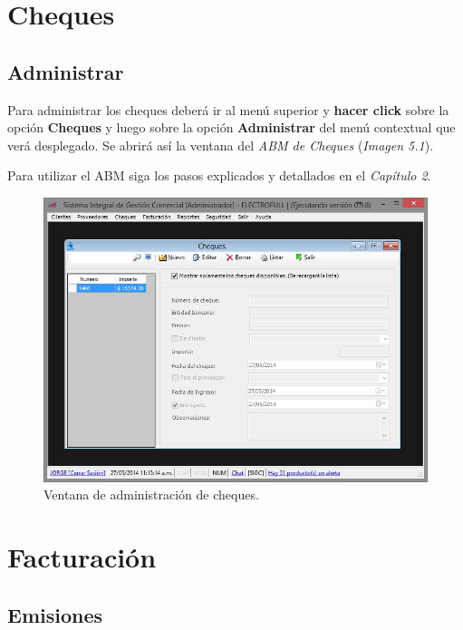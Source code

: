 \documentclass{book}
\begin{document}
%
%
\chapter{Cheques}


\section{Administrar}

Para administrar los cheques deberá ir al menú superior y \textbf{hacer click} sobre la opción \textbf{Cheques} y luego sobre la opción \textbf{Administrar} del menú contextual que verá desplegado. Se abrirá así la ventana del \textit{ABM de Cheques} (\textit{Imagen 5.1}). 
\par
Para utilizar el ABM siga los pasos explicados y detallados en el \textit{Capítulo 2}. 
\bigskip

\begin{figure}[H]
	\centering
	\includegraphics[width=1.0\textwidth]{images/ventanas/ventana-08.jpg}
	\caption{Ventana de administración de cheques.}
	\medskip
\end{figure}
\medskip


%
%
\chapter{Facturación}


\section{Emisiones}
\end{document}
